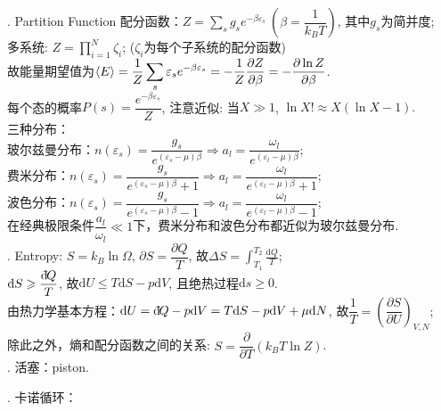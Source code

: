 \documentclass[12pt, 
]{article}
\newcommand{\dbar}{\mathrm{d}\hspace*{-0.2em}\bar{}\hspace*{0.1em}}
\begin{document}
. Partition Function 配分函数：$Z=\displaystyle\sum_s g_s e^{-\beta\varepsilon_s}~(\beta=\dfrac{1}{k_BT})$, 其中$g_s$为简并度;~\\\phantom{~~~}多系统: $Z=\displaystyle\prod_{i=1}^N\zeta_i$; ($\zeta_i$为每个子系统的配分函数)
~\\\phantom{~~~}故能量期望值为$\braket{E}=\displaystyle\frac{1}{Z}\sum_s\varepsilon_s e^{-\beta\varepsilon_s}=-\frac{1}{Z}\frac{\partial Z}{\partial \beta}=-\frac{\partial\ln{Z}}{\partial\beta}$.
~\\\phantom{~~~}每个态的概率$P(s)=\dfrac{e^{-\beta\varepsilon_s}}{Z}$, 注意近似: 当$X\gg1$, $\ln{X!}\approx X(\ln{X}-1).$
~\\\phantom{~~~}三种分布：
~\\\phantom{~~~~~~~~~}玻尔兹曼分布：$n(\varepsilon_s)=\dfrac{g_s}{e^{(\varepsilon_s-\mu)\beta}}\Rightarrow a_l=\dfrac{\omega_l}{e^{(\varepsilon_l-\mu)\beta}}$;
~\\\phantom{~~~~~~~~~}费米分布：$n(\varepsilon_s)=\dfrac{g_s}{e^{(\varepsilon_s-\mu)\beta}+1}\Rightarrow a_l=\dfrac{\omega_l}{e^{(\varepsilon_l-\mu)\beta}+1}$;
~\\\phantom{~~~~~~~~~}波色分布：$n(\varepsilon_s)=\dfrac{g_s}{e^{(\varepsilon_s-\mu)\beta}-1}\Rightarrow a_l=\dfrac{\omega_l}{e^{(\varepsilon_l-\mu)\beta}-1}$;
~\\\phantom{~~~}在经典极限条件$\dfrac{a_l}{\omega_l}\ll 1$下，费米分布和波色分布都近似为玻尔兹曼分布.
~\\

. Entropy: $S=k_B\ln{\Omega}$, $\partial S=\dfrac{\partial Q}{T}$, 故$\Delta S=\displaystyle\int_{T_1}^{T_2}\frac{\mathrm{d}Q}{T}$;
~\\\phantom{~~~}$\mathrm{d}S\geqslant\dfrac{\dbar Q}{T}$, 故$\mathrm{d}U\leqslant T\mathrm{d}S-p\mathrm{d}V$, 且绝热过程$\mathrm{d}s\geqslant0$.
~\\\phantom{~~~}由热力学基本方程：$\mathrm{d}U=\dbar Q-p\mathrm{d}V=T\mathrm{d}S-p\mathrm{d}V+\mu\mathrm{d}N$, 故$\dfrac{1}{T}=\left(\dfrac{\partial S}{\partial U}\right)_{V,N}$;
~\\\phantom{~~~}除此之外，熵和配分函数之间的关系: $S=\dfrac{\partial}{\partial T}(k_BT\ln{Z})$.~\\

. 活塞：piston. 
~\\

. 卡诺循环：
\end{document}
